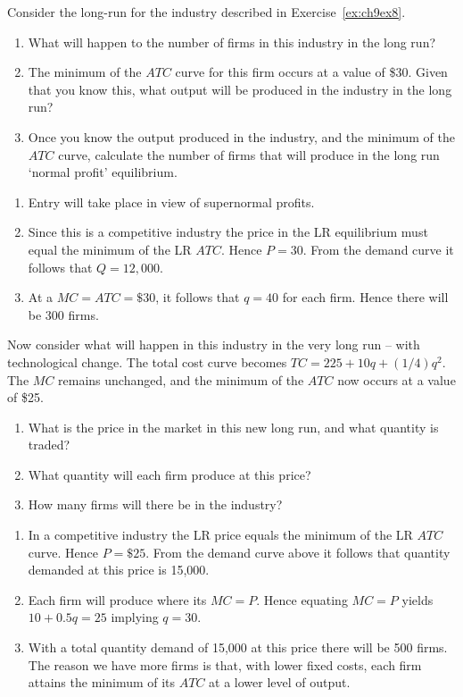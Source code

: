 \begin{enumialphparenastyle}
\begin{ex}\label{ex:ch9ex9}
Consider the long-run for the industry described in Exercise~\ref{ex:ch9ex8}.
\begin{enumerate}
	\item	What will happen to the number of firms in this industry in the long run?
	\item	The minimum of the $ATC$ curve for this firm occurs at a value of \$30. Given that you know this, what output will be produced in the industry in the long run?
	\item	Once you know the output produced in the industry, and the minimum of the $ATC$ curve, calculate the number of firms that will produce in the long run `normal profit' equilibrium.
\end{enumerate}
\begin{sol}
\begin{enumerate}
	\item	Entry will take place in view of supernormal profits.
	\item	Since this is a competitive industry the price in the LR equilibrium must equal the minimum of the LR $ATC$. Hence $P=30$. From the demand curve it follows that $Q=12,000$.
	\item	At a $MC=ATC=\$30$, it follows that $q=40$ for each firm. Hence there will be 300 firms.
\end{enumerate}
\end{sol}
\end{ex}

\begin{ex}\label{ex:ch9ex10}
Now consider what will happen in this industry in the very long run -- with technological change. The total cost curve becomes $TC=225+10q+(1/4)q^2$. The $MC$ remains unchanged, and the minimum of the $ATC$ now occurs at a value of \$25.
\begin{enumerate}
	\item	What is the price in the market in this new long run, and what quantity is traded? 
	\item	What quantity will each firm produce at this price?  
	\item	How many firms will there be in the industry?
\end{enumerate}
\begin{sol}
\begin{enumerate}
	\item	In a competitive industry the LR price equals the minimum of the LR $ATC$ curve. Hence $P=\$25$. From the demand curve above it follows that quantity demanded at this price is 15,000.
	\item	Each firm will produce where its $MC=P$. Hence equating $MC=P$ yields $10+0.5q=25$ implying $q=30$.
	\item	With a total quantity demand of 15,000 at this price there will be 500 firms. The reason we have more firms is that, with lower fixed costs, each firm attains the minimum of its $ATC$ at a lower level of output. 
\end{enumerate}
\end{sol}
\end{ex}


\end{enumialphparenastyle}
